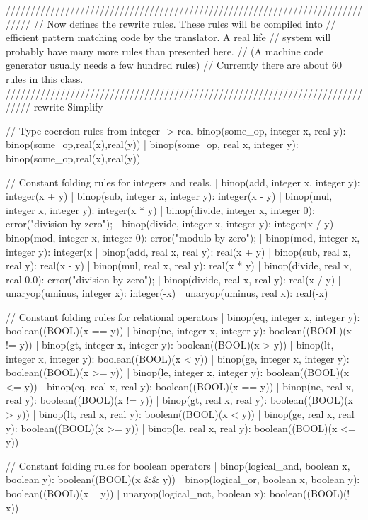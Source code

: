 \begin{prop}
/////////////////////////////////////////////////////////////////////////////
//  Now defines the rewrite rules.  These rules will be compiled into 
//  efficient pattern matching code by the translator.  A real life 
//  system will probably have many more rules than presented here.
//  (A machine code generator usually needs a few hundred rules)
//  Currently there are about 60 rules in this class.
/////////////////////////////////////////////////////////////////////////////
rewrite Simplify
{  
   // Type coercion rules from integer -> real
   binop(some_op, integer x, real y): binop(some_op,real(x),real(y))
|  binop(some_op, real x, integer y): binop(some_op,real(x),real(y))

   // Constant folding rules for integers and reals.
|  binop(add,    integer x, integer y): integer(x + y)
|  binop(sub,    integer x, integer y): integer(x - y)
|  binop(mul,    integer x, integer y): integer(x * y)
|  binop(divide, integer x, integer 0): { error("division by zero"); }
|  binop(divide, integer x, integer y): integer(x / y)
|  binop(mod,    integer x, integer 0): { error("modulo by zero"); }
|  binop(mod,    integer x, integer y): integer(x %
|  binop(add,    real x,    real y):    real(x + y)
|  binop(sub,    real x,    real y):    real(x - y)
|  binop(mul,    real x,    real y):    real(x * y)
|  binop(divide, real x,    real 0.0):  { error("division by zero"); }
|  binop(divide, real x,    real y):    real(x / y)
|  unaryop(uminus, integer x):          integer(-x)
|  unaryop(uminus, real    x):          real(-x)

// Constant folding rules for relational operators
|  binop(eq,  integer x, integer y):    boolean((BOOL)(x == y))
|  binop(ne,  integer x, integer y):    boolean((BOOL)(x != y))
|  binop(gt,  integer x, integer y):    boolean((BOOL)(x > y))
|  binop(lt,  integer x, integer y):    boolean((BOOL)(x < y))
|  binop(ge,  integer x, integer y):    boolean((BOOL)(x >= y))
|  binop(le,  integer x, integer y):    boolean((BOOL)(x <= y))
|  binop(eq,  real x,    real y):       boolean((BOOL)(x == y))
|  binop(ne,  real x,    real y):       boolean((BOOL)(x != y))
|  binop(gt,  real x,    real y):       boolean((BOOL)(x > y))
|  binop(lt,  real x,    real y):       boolean((BOOL)(x < y))
|  binop(ge,  real x,    real y):       boolean((BOOL)(x >= y))
|  binop(le,  real x,    real y):       boolean((BOOL)(x <= y))

// Constant folding rules for boolean operators
|  binop(logical_and, boolean x, boolean y):  boolean((BOOL)(x && y))
|  binop(logical_or,  boolean x, boolean y):  boolean((BOOL)(x || y))
|  unaryop(logical_not, boolean x):           boolean((BOOL)(! x))

}
\end{prop}
